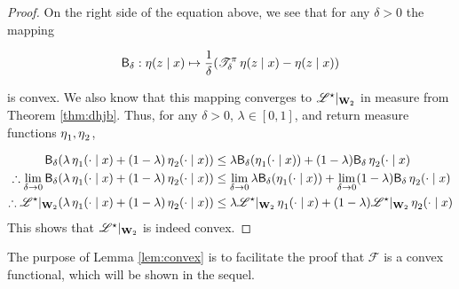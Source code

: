 \begin{proof}
  On the right side of the equation above, we see that for any
  $\delta>0$ the mapping

  \begin{align*}
  \mathsf{B}_\delta:\operatorname{\eta}(z\mid x)\mapsto
    \frac{1}{\delta}(\mathscr{T}^{\pi}_\delta \operatorname{\eta}(z\mid x) -
    \operatorname{\eta}(z\mid x))
  \end{align*}

  is convex. We also know that this mapping converges to
  $\mathscr{L}^\star\rvert_{\mathbf{W}_{2}}$ in measure from
  Theorem \ref{thm:dhjb}. Thus, for any $\delta>0$, $\lambda\in
  [0,1]$, and return measure functions $\operatorname{\eta}_1, \operatorname{\eta}_2$,

  \begin{align*}
    \mathsf{B}_\delta(\lambda\operatorname{\eta}_1(\cdot\mid x) +
    (1-\lambda)\operatorname{\eta}_2(\cdot\mid x))
    &\leq \lambda\mathsf{B}_\delta(\operatorname{\eta}_1(\cdot\mid x)) +
      (1-\lambda)\mathsf{B}_\delta\operatorname{\eta}_2(\cdot\mid x)\\
    \therefore \lim_{\delta\to 0}\mathsf{B}_\delta(\lambda\operatorname{\eta}_1(\cdot\mid x) +
    (1-\lambda)\operatorname{\eta}_2(\cdot\mid x))
    &\leq \lim_{\delta\to 0}\lambda\mathsf{B}_\delta(\operatorname{\eta}_1(\cdot\mid x)) +
      \lim_{\delta\to 0}(1-\lambda)\mathsf{B}_\delta\operatorname{\eta}_2(\cdot\mid x)\\
    \therefore\mathscr{L}^\star\rvert_{\mathbf{W}_{2}}(\lambda\operatorname{\eta}_1(\cdot\mid x) +
    (1-\lambda)\operatorname{\eta}_2(\cdot\mid x))
    &\leq
      \lambda\mathscr{L}^\star\rvert_{\mathbf{W}_{2}}\operatorname{\eta}_1(\cdot\mid x) +
      (1-\lambda)\mathscr{L}^\star\rvert_{\mathbf{W}_{2}}\operatorname{\eta}_2(\cdot\mid x)
  \end{align*}
  This shows that $\mathscr{L}^\star\rvert_{\mathbf{W}_{2}}$ is indeed convex.
\end{proof}

The purpose of Lemma \ref{lem:convex} is to facilitate the proof that
$\mathscr{F}$ is a convex functional, which will be shown in the sequel.

